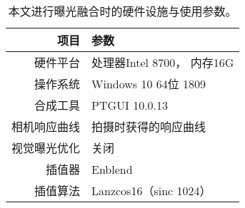 \begin{table}[htbp]
    \centering
    \caption[曝光融合参数列表]{
        \label{table:fusion-config}
        本文进行曝光融合时的硬件设施与使用参数。
    }
    \begin{tabular}{r|l}
        \toprule
        \textbf{项目} & \textbf{参数}\\
        \hline
        硬件平台 & 处理器Intel 8700， 内存16G\\
        操作系统 & Windows 10 64位 1809\\
        合成工具 & PTGUI \cite{ptgui} 10.0.13\\
        \hline
        相机响应曲线  & 拍摄时获得的响应曲线\\
        视觉曝光优化  & 关闭\\
        插值器       & Enblend \\
        插值算法 &  Lanzcos16（sinc 1024）\\
        \bottomrule    
    \end{tabular}
\end{table}